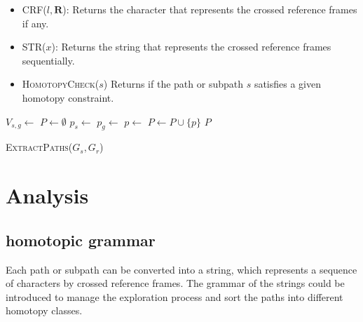 \documentclass[letterpaper, 10 pt, conference]{ieeeconf}
\begin{document}
\begin{itemize}
	\item \textsc{CRF}($ l, \bm{R} $):
	Returns the character that represents the crossed reference frames if any.
	\item \textsc{STR}($ x $):	
	Returns the string that represents the crossed reference frames sequentially.
	\item \textsc{HomotopyCheck}{($ s $)}
	Returns if the path or subpath $ s $ satisfies a given homotopy constraint.
\end{itemize}



\begin{algorithm}
	\begin{algorithmic}[1]
		\State $ V_{s,g} \leftarrow $ 
		\State $ P \leftarrow \emptyset $
			\State $ p_{s} \leftarrow $ 
			\State $ p_{g} \leftarrow $ 
			\State $ p \leftarrow $ 
			\State $ P \leftarrow P \cup \{ p \} $
		\EndFor
		\Return $ P $
	\end{algorithmic}
	\caption{ \textsc{ExtractPaths}($ G_{s}, G_{r} $) }
	\label{alg:harrt:binding}
\end{algorithm}


\section{Analysis}
\label{sec:analysis}



\subsection{homotopic grammar}

Each path or subpath can be converted into a string, which represents a sequence of characters by crossed reference frames.
The grammar of the strings could be introduced to manage the exploration process and sort the paths into different homotopy classes.
\end{document}
